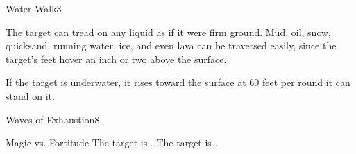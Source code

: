 \begin{spellsection}{Water Walk}{3}
\begin{spellheader}
    \begin{spelltargetinginfo}
    \end{spelltargetinginfo}
\end{spellheader}
\begin{spellcontent}
    \begin{spelleffects}
        \spelleffect The target can tread on any liquid as if it were firm ground. Mud, oil, snow, quicksand, running water, ice, and even lava can be traversed easily, since the target's feet hover an inch or two above the surface.
        \par If the target is underwater, it rises toward the surface at 60 feet per round it can stand on it.
        \spelldur \durlong \dismissable
    \end{spelleffects}
\end{spellcontent}
\begin{spellfooter}
\end{spellfooter}
\end{spellsection}

\begin{spellsection}{Waves of Exhaustion}{8}
\begin{spellheader}
    \begin{spelltargetinginfo}
    \end{spelltargetinginfo}
\end{spellheader}
\begin{spellcontent}
    \begin{spelleffects}
        \begin{spellattack}{Magic vs. Fortitude}
            \spellsuccess The target is \exhausted.
            \spellfailure The target is \fatigued.
        \end{spellattack}
        \spelldur \durshort
    \end{spelleffects}
\end{spellcontent}
\begin{spellfooter}
\end{spellfooter}
\end{spellsection}

